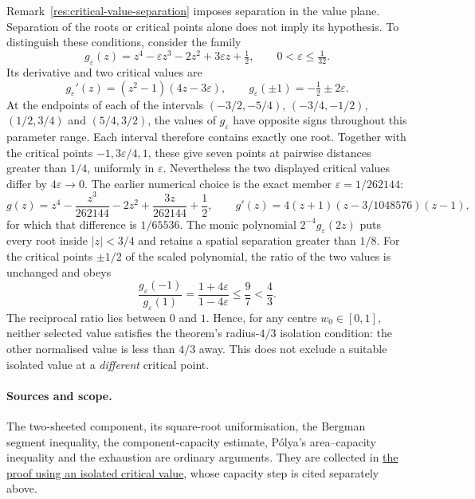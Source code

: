 \documentclass[11pt]{article}
\begin{document}
Remark~\ref{res:critical-value-separation} imposes separation in the
value plane. Separation of the roots or critical points alone does not
imply its hypothesis.
To distinguish these conditions, consider the family
\[
 g_\varepsilon(z)=z^4-\varepsilon z^3-2z^2+3\varepsilon z+\tfrac12,
 \qquad 0<\varepsilon\le\tfrac1{32}.
\]
Its derivative and two critical values are
\[
 g_\varepsilon'(z)=(z^2-1)(4z-3\varepsilon),\qquad
 g_\varepsilon(\pm1)=-\tfrac12\pm2\varepsilon.
\]
At the endpoints of each of the intervals
$(-3/2,-5/4)$, $(-3/4,-1/2)$, $(1/2,3/4)$ and $(5/4,3/2)$,
the values of $g_\varepsilon$ have opposite signs throughout this parameter
range. Each interval therefore contains exactly one root. Together with
the critical points $-1,3\varepsilon/4,1$, these give seven points at
pairwise distances greater than $1/4$, uniformly in $\varepsilon$.
Nevertheless the two displayed critical values differ by $4\varepsilon\to0$.
The earlier numerical choice is the exact member $\varepsilon=1/262144$:
\[
 g(z)=z^4-\frac{z^3}{262144}-2z^2+\frac{3z}{262144}+\frac12,
 \qquad
 g'(z)=4(z+1)(z-3/1048576)(z-1),
\]
for which that difference is $1/65536$.
The monic polynomial $2^{-4}g_\varepsilon(2z)$ puts every root inside
$|z|<3/4$ and retains a spatial separation greater than $1/8$.
For the critical points $\pm1/2$ of the scaled polynomial, the ratio
of the two values is unchanged and obeys
\[
 \frac{g_\varepsilon(-1)}{g_\varepsilon(1)}
 =\frac{1+4\varepsilon}{1-4\varepsilon}\le\frac97<\frac43.
\]
The reciprocal ratio lies between $0$ and $1$. Hence, for any centre
$w_0\in[0,1]$, neither selected value satisfies the theorem's
radius-$4/3$ isolation condition: the other normalised value is less
than $4/3$ away. This does not exclude a suitable isolated value at a
\emph{different} critical point.

\paragraph{Sources and scope.}
\label{bdry:critical-value-separation}
The two-sheeted component, its square-root uniformisation, the Bergman segment
inequality, the component-capacity estimate, P\'olya's area--capacity
inequality and the exhaustion are ordinary arguments. They are collected in
\href{https://github.com/wcook04/plectis-erdos/blob/8efbccc235df64a38d83f5dc7b1949e2ad18270d/research_corpus/Erdos1041/problem/DiskFamilyCriticalValueSeparation.md}{the proof using an isolated critical value}, whose capacity step is cited
separately above.
\end{document}

